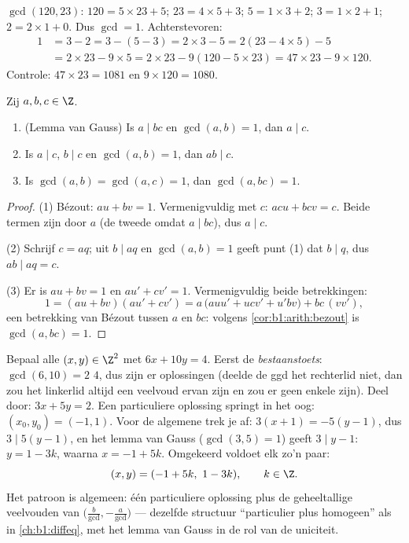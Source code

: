 \begin{example}\label{ex:b1:arith:euclid}
$\gcd(120, 23)$: $120 = 5 \times 23 + 5$; $23 = 4 \times 5 + 3$; $5 =
1\times 3 + 2$; $3 = 1 \times 2 + 1$; $2 = 2 \times 1 + 0$. Dus $\gcd =
1$. Achterstevoren:
\begin{align*}
1 &= 3 - 2 = 3 - (5 - 3) = 2\times 3 - 5 = 2(23 - 4\times 5) - 5 \\
&= 2 \times 23 - 9 \times 5 = 2\times 23 - 9(120 - 5\times 23)
= 47 \times 23 - 9 \times 120 .
\end{align*}
Controle: $47 \times 23 = 1081$ en $9 \times 120 = 1080$.
\end{example}

\begin{theorem}\label{thm:b1:arith:gauss}
Zij $a, b, c \in \Z$.
\begin{enumerate}
  \item (Lemma van Gauss) Is $a \mid bc$ en
        $\gcd(a, b) = 1$, dan $a \mid c$.
  \item Is $a \mid c$, $b \mid c$ en $\gcd(a,b) = 1$, dan $ab \mid c$.
  \item Is $\gcd(a, b) = \gcd(a, c) = 1$, dan $\gcd(a, bc) = 1$.
\end{enumerate}
\end{theorem}

\begin{proof}
(1) Bézout: $au + bv = 1$. Vermenigvuldig met $c$: $acu + bcv = c$. Beide
termen zijn  door $a$ (de tweede omdat $a \mid bc$), dus $a \mid
c$.

(2) Schrijf $c = aq$; uit $b \mid aq$ en $\gcd(a, b) = 1$ geeft punt (1)
dat $b \mid q$, dus $ab \mid aq = c$.

(3) Er is $au + bv = 1$ en $au' + cv' = 1$. Vermenigvuldig beide
betrekkingen:
\[
1 = (au + bv)(au' + cv')
= a\,\bigl(auu' + ucv' + u'bv\bigr) + bc\,(vv') ,
\]
een betrekking van Bézout tussen $a$ en $bc$: volgens
\cref{cor:b1:arith:bezout} is $\gcd(a, bc) = 1$.
\end{proof}

\begin{example}\label{ex:b1:arith:diophantine}
Bepaal alle $(x, y) \in \Z^2$ met $6x + 10y = 4$. Eerst de
\emph{bestaanstoets}: $\gcd(6, 10) = 2$  $4$, dus zijn er
oplossingen (deelde de ggd het rechterlid niet, dan zou het linkerlid
altijd een veelvoud ervan zijn en zou er geen enkele zijn). Deel door:
$3x + 5y = 2$. Een particuliere oplossing springt in het oog: $(x_0, y_0)
= (-1, 1)$. Voor de algemene trek je af: $3(x + 1) = -5(y - 1)$, dus $3
\mid 5(y-1)$, en het lemma van Gauss ($\gcd(3,5) = 1$) geeft $3 \mid y -
1$: $y = 1 - 3k$, waarna $x = -1 + 5k$. Omgekeerd voldoet elk zo'n paar:
\[
(x, y) = (-1 + 5k,\ 1 - 3k), \qquad k \in \Z .
\]
Het patroon is algemeen: één particuliere oplossing plus de geheeltallige
veelvouden van $\bigl(\frac b{\gcd}, -\frac a{\gcd}\bigr)$ --- dezelfde
structuur ``particulier plus homogeen'' als in \cref{ch:b1:diffeq}, met
het lemma van Gauss in de rol van de uniciteit.
\end{example}

